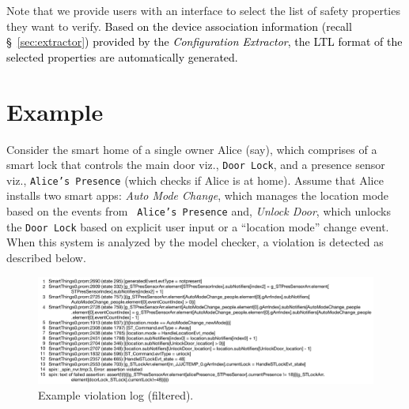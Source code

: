 Note that we provide users with an interface to select the list of safety properties they want to verify. \textcolor{black}{Based on the device association information (recall \S~\ref{sec:extractor}) provided by the \textit{Configuration Extractor}, the LTL format of the selected properties are automatically generated.}

\section{Example} Consider the smart home of a single owner Alice (say),
which comprises of a smart lock that controls the main door viz., \texttt{Door Lock},
and a presence sensor viz., \texttt{Alice's Presence}
(which checks if Alice is at home).
Assume that Alice installs two smart apps: \textit{Auto Mode Change},
which manages the location mode based on the events from \texttt{
Alice's Presence}
and, \textit{Unlock Door}, which unlocks the \texttt{Door Lock} based on explicit user input
or a ``location mode'' change event.
When this system is analyzed by the model checker, a violation is detected as described below.

\hfill \break

\begin{figure}[tb]
\ssp
\begin{center}
    \includegraphics[width=6.1in]{verificationlog}
    \caption{Example violation log (filtered).}
	\label{verificationlog}
\end{center}
\end{figure}


